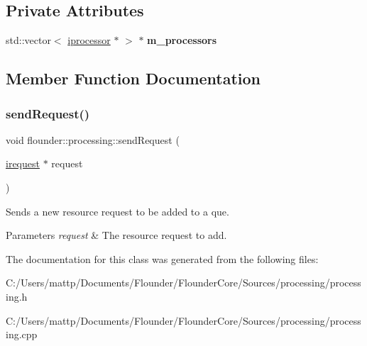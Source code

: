 \subsection*{Private Attributes}
\begin{DoxyCompactItemize}
\item 
\mbox{\label{classflounder_1_1processing_a77870c9b9e04569dc459767d11c47da5}} 
std\+::vector$<$ \hyperlink{classflounder_1_1iprocessor}{iprocessor} $\ast$ $>$ $\ast$ {\bfseries m\+\_\+processors}
\end{DoxyCompactItemize}


\subsection{Member Function Documentation}
\mbox{\label{classflounder_1_1processing_addb84aad44d50ae3fa9513cddcea9968}} 
\subsubsection{\texorpdfstring{send\+Request()}{sendRequest()}}
{\footnotesize\ttfamily void flounder\+::processing\+::send\+Request (\begin{DoxyParamCaption}\item[{\hyperlink{classflounder_1_1irequest}{irequest} $\ast$}]{request }\end{DoxyParamCaption})}



Sends a new resource request to be added to a que. 


\begin{DoxyParams}{Parameters}
{\em request} & The resource request to add. \\
\hline
\end{DoxyParams}


The documentation for this class was generated from the following files\+:\begin{DoxyCompactItemize}
\item 
C\+:/\+Users/mattp/\+Documents/\+Flounder/\+Flounder\+Core/\+Sources/processing/processing.\+h\item 
C\+:/\+Users/mattp/\+Documents/\+Flounder/\+Flounder\+Core/\+Sources/processing/processing.\+cpp\end{DoxyCompactItemize}
